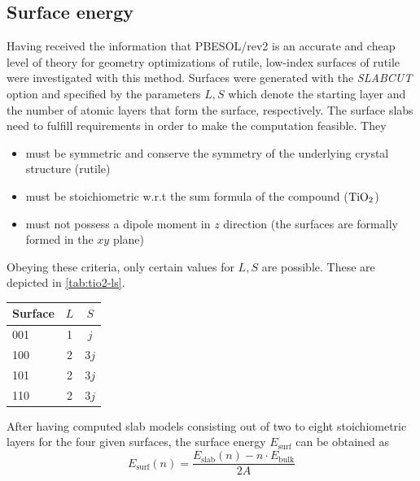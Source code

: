 \documentclass[a4paper,12pt]{scrartcl}
\begin{document}
\subsection{Surface energy}
%
Having received the information that PBESOL/rev2 is an accurate and cheap level of theory for geometry optimizations of rutile, low-index surfaces of rutile were investigated with this method. Surfaces were generated with the \textit{SLABCUT} option and specified by the parameters $ L, S $ which denote the starting layer and the number of atomic layers that form the surface, respectively. The surface slabs need to fulfill requirements in order to make the computation feasible. They
%
\begin{itemize}
	\item must be symmetric and conserve the symmetry of the underlying crystal structure (rutile) \\
	\item must be stoichiometric w.r.t the sum formula of the compound ($ \ce{TiO2} $) \\
	\item must not possess a dipole moment in $ z $ direction (the surfaces are formally formed in the $ xy $ plane)
\end{itemize}
%
Obeying these criteria, only certain values for $ L, S $ are possible. These are depicted in \autoref{tab:tio2-ls}.
%
\begin{table}[H]
	\centering
	\label{tab:tio2-ls}
	\begin{tabular}{lcc}
		\toprule
		Surface & $ L $ & $ S $ \\
		\midrule
		001     & 1 & $j$  \\
		100     & 2 & $3j$    \\
		101     & 2 & $3j$    \\
		110     & 2 & $3j$     \\
		\bottomrule
	\end{tabular}
\end{table}
%
After having computed slab models consisting out of two to eight stoichiometric layers for the four given surfaces, the surface energy $ E_\mathrm{surf} $ can be obtained as
%
\begin{equation}
	E_\mathrm{surf} (n) = \frac{E_\mathrm{slab}(n) - n \cdot E_\mathrm{bulk}}{2A}
\end{equation}
%
\end{document}
